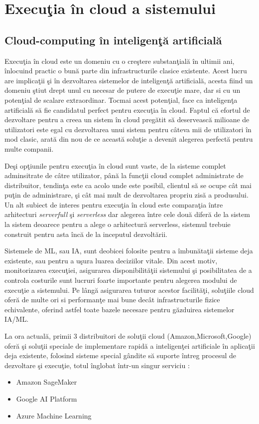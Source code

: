 \documentclass[a4paper,12pt]{report}
\begin{document}
\chapter{Execuţia în cloud a sistemului}
\section{Cloud-computing în inteligenţă artificială}
\quad Execuţia în cloud este un domeniu cu o creştere substanţială în ultimii ani, înlocuind practic o bună parte din infrastructurile clasice existente. Acest lucru are implicaţii şi în dezvoltarea sistemelor de inteligenţă artificială, acesta fiind un domeniu ştiut drept unul cu necesar de putere de execuţie mare, dar si cu un potenţial de scalare extraordinar. Tocmai acest potenţial, face ca inteligenţa artificială să fie candidatul perfect pentru execuţia în cloud. Faptul că efortul de dezvoltare pentru a creea un sistem în cloud pregătit să deservească milioane de utilizatori este egal cu dezvoltarea unui sistem pentru câteva mii de utilizatori în mod clasic, arată din nou de ce această soluţie a devenit alegerea perfectă pentru multe companii.
\par Deşi opţiunile pentru execuţia în cloud sunt vaste, de la sisteme complet adminsitrate de câtre utilizator, până la funcţii cloud complet administrate de distribuitor, tendinţa este ca acolo unde este posibil, clientul să se ocupe cât mai puţin de administrare, şi cât mai mult de dezvoltarea propriu zisă a produsului. Un alt subiect de interes pentru execuţia în cloud este comparaţia între arhitecturi \emph{serverfull} şi \emph{serverless} dar alegerea între cele două diferă de la sistem la sistem deoarece pentru a alege o arhitectură serverless, sistemul trebuie construit pentru asta încă de la inceputul dezvoltării. 
\par Sistemele de ML, sau IA, sunt deobicei folosite pentru a îmbunătaţii sisteme deja existente, sau pentru a uşura luarea deciziilor vitale. Din acest motiv, monitorizarea execuţiei, asigurarea disponibilităţii sistemului şi posibilitatea de a controla costurile sunt lucruri foarte importante pentru alegerea modului de execuţie a sistemului. Pe lângă asigurarea tuturor acestor facilităţi, soluţiile cloud oferă de multe ori si performanţe mai bune decât infrastructurile fizice echivalente, oferind astfel toate bazele necesare pentru găzduirea sistemelor IA/ML.
\newpage
\par La ora actuală, primii 3 distribuitori de soluţii cloud (Amazon,Microsoft,Google) oferă şi soluţii speciale de implementare rapidă a inteligenţei artificiale în aplicaţii deja existente, folosind sisteme special gândite să suporte întreg procesul de dezvoltare şi execuţie, totul înglobat într-un singur serviciu :
\begin{itemize}
\item Amazon SageMaker
\item Google AI Platform
\item Azure Machine Learning
\end{itemize} 
\end{document}
